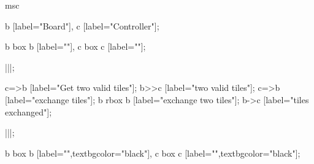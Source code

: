 \begin{msc}
msc
{

b [label="Board"],
c [label="Controller"];

b box b [label=""],
c box c [label=""];

|||;

c=>b [label="Get two valid tiles"];
b>>c [label="two valid tiles"];
c=>b [label="exchange tiles"];
b rbox b [label="exchange two tiles"];
b->c [label="tiles exchanged"];

|||;

b box b [label="",textbgcolor="black"],
c box c [label="",textbgcolor="black"];

}
\end{msc}
